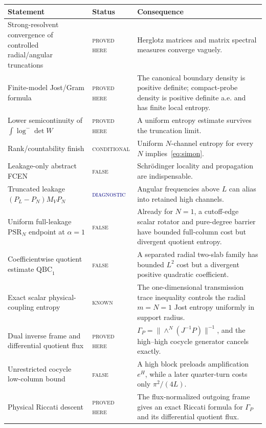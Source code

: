 \documentclass[11pt]{article}
\newcommand{\statusproved}{\textcolor{proved}{\textsc{proved here}}}
\newcommand{\statusknown}{\textcolor{proved}{\textsc{known}}}
\newcommand{\statusconditional}{\textcolor{open}{\textsc{conditional}}}
\newcommand{\statusfailed}{\textcolor{failed}{\textsc{false}}}
\newcommand{\statusdiagnostic}{\textcolor{navy}{\textsc{diagnostic}}}
\theoremstyle{definition}
\theoremstyle{remark}
\begin{document}
\begin{longtable}{>{\raggedright\arraybackslash}p{}>{\raggedright\arraybackslash}p{}>{\raggedright\arraybackslash}p{}}
\toprule
Statement & Status & Consequence \\
\midrule
\endhead
Strong-resolvent convergence of controlled radial/angular truncations & \statusproved & Herglotz matrices and matrix spectral measures converge vaguely. \\
Finite-model Jost/Gram formula & \statusproved & The canonical boundary density is positive definite; compact-probe density is positive definite a.e. and has finite local entropy. \\
Lower semicontinuity of $\int\log^-\det W$ & \statusproved & A uniform entropy estimate survives the truncation limit. \\
Rank/countability finish & \statusconditional & Uniform $N$-channel entropy for every $N$ implies~\eqref{eq:simon}. \\
Leakage-only abstract FCEN & \statusfailed & Schr\"odinger locality and propagation are indispensable. \\
Truncated leakage $(P_L-P_N)M_VP_N$ & \statusdiagnostic & Angular frequencies above $L$ can alias into retained high channels. \\
Uniform full-leakage $\mathrm{PSR}_N$ endpoint at $\alpha=1$ & \statusfailed & Already for $N=1$, a cutoff-edge scalar rotator and pure-degree barrier have bounded full-column cost but divergent quotient entropy. \\
Coefficientwise quotient estimate $\mathrm{QBC}_1$ & \statusfailed & A separated radial two-slab family has bounded $L^2$ cost but a divergent positive quadratic coefficient. \\
Exact scalar physical-coupling entropy & \statusknown & The one-dimensional transmission trace inequality controls the radial $m=N=1$ Jost entropy uniformly in support radius. \\
Dual inverse frame and differential quotient flux & \statusproved & $\Gamma_P=\|\wedge^N(J^{-1}P)\|^{-1}$, and the high--high cocycle generator cancels exactly. \\
Unrestricted cocycle low-column bound & \statusfailed & A high block preloads amplification $e^H$, while a later quarter-turn costs only $\pi^2/(4L)$. \\
Physical Riccati descent & \statusproved & The flux-normalized outgoing frame gives an exact Riccati formula for $\Gamma_P$ and its differential quotient flux. \\

\end{longtable}
\end{document}
